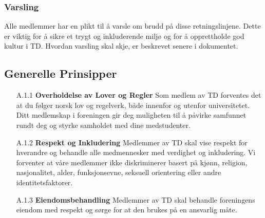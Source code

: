 \documentclass[11pt]{article}
\begin{document}
\subsubsection{Varsling}
Alle medlemmer har en plikt til å varsle om brudd på disse retningslinjene. Dette er viktig for å sikre et trygt og inkluderende miljø og for å opprettholde god kultur i TD. Hvordan varsling skal skje, er beskrevet senere i dokumentet.
 
\subsection{Generelle Prinsipper}
 \begin{itemize}
     \item[A.1.1] \textbf{Overholdelse av Lover og Regler}
     \newline
     Som medlem av TD forventes det at du følger norsk lov og regelverk, både innenfor og utenfor universitetet. Ditt medlemskap i foreningen gir deg muligheten til å påvirke samfunnet rundt deg og styrke samholdet med dine medstudenter.

     \item[A.1.2] \textbf{Respekt og Inkludering} 
     \newline
     Medlemmer av TD skal vise respekt for hverandre og behandle alle medmennesker med verdighet og inkludering. Vi forventer at våre medlemmer ikke diskriminerer basert på kjønn, religion, nasjonalitet, alder, funksjonsevne, seksuell orientering eller andre identitetsfaktorer.

     \item[A.1.3] \textbf{Eiendomsbehandling}
     \newline
     Medlemmer av TD skal behandle foreningens eiendom med respekt og sørge for at den brukes på en ansvarlig måte.     
 \end{itemize}
\end{document}
